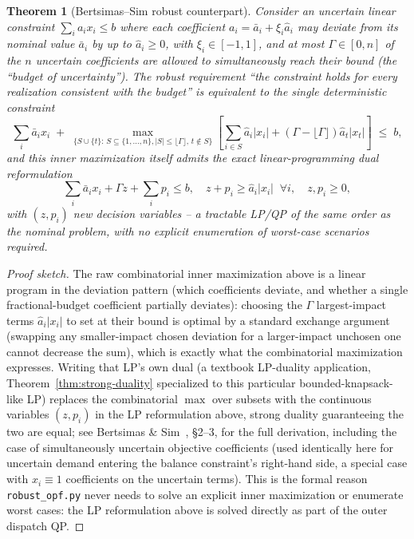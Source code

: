\documentclass[11pt]{report}
\newcommand{\pkg}[1]{\texttt{#1}}
\theoremstyle{plain}
\newtheorem{theorem}{Theorem}[chapter]
\theoremstyle{definition}
\theoremstyle{remark}
\begin{document}
\begin{theorem}[Bertsimas--Sim robust counterpart]
\label{thm:bertsimas-sim}
Consider an uncertain linear constraint $\sum_ia_ix_i\le b$ where each
coefficient $a_i=\bar a_i+\xi_i\hat a_i$ may deviate from its nominal
value $\bar a_i$ by up to $\hat a_i\ge0$, with $\xi_i\in[-1,1]$, and at
most $\Gamma\in[0,n]$ of the $n$ uncertain coefficients are allowed to
simultaneously reach their bound (the ``budget of uncertainty''). The
robust requirement ``the constraint holds for every realization
consistent with the budget'' is equivalent to the single deterministic
constraint
\begin{equation}
\sum_i\bar a_ix_i \;+\; \max_{\{S\cup\{t\}:\,S\subseteq\{1,\ldots,n\},\left|S\right|\le\lfloor\Gamma\rfloor,\,t\notin S\}}
\left[\sum_{i\in S}\hat a_i\left|x_i\right| + (\Gamma-\lfloor\Gamma\rfloor)\hat a_t\left|x_t\right|\right] \;\le\; b,
\label{eq:bs-robust-raw}
\end{equation}
and this inner maximization itself admits the exact linear-programming
dual reformulation
\begin{equation}
\sum_i\bar a_ix_i + \Gamma z + \sum_ip_i \le b, \quad
z+p_i\ge\hat a_i\left|x_i\right|\;\;\forall i, \quad z,p_i\ge0,
\label{eq:bs-robust-lp}
\end{equation}
with $(z,p_i)$ new decision variables -- a tractable LP/QP of the same
order as the nominal problem, with no explicit enumeration of worst-case
scenarios required.
\end{theorem}
\begin{proof}[Proof sketch]
The raw combinatorial inner maximization above is a linear program
in the deviation pattern (which coefficients deviate, and whether a
single fractional-budget coefficient partially deviates): choosing the
$\Gamma$ largest-impact terms $\hat a_i\left|x_i\right|$ to set at their bound is
optimal by a standard exchange argument (swapping any smaller-impact
chosen deviation for a larger-impact unchosen one cannot decrease the
sum), which is exactly what the combinatorial maximization expresses.
Writing that LP's own dual (a textbook LP-duality application,
Theorem~\ref{thm:strong-duality} specialized to this particular
bounded-knapsack-like LP) replaces the combinatorial $\max$ over
subsets with the continuous variables $(z,p_i)$ in the LP reformulation
above, strong duality guaranteeing the two are
equal; see Bertsimas \& Sim~\cite{bertsimas}, \S2--3, for the full
derivation, including the case of simultaneously uncertain
objective coefficients (used identically here for uncertain demand
entering the balance constraint's right-hand side, a special case with
$x_i\equiv1$ coefficients on the uncertain terms). This is the formal
reason \pkg{robust\_\hspace{0pt}opf.py} never needs to solve an explicit inner
maximization or enumerate worst cases: the LP reformulation above is
solved directly as part of the outer dispatch QP.
\end{proof}
\end{document}
